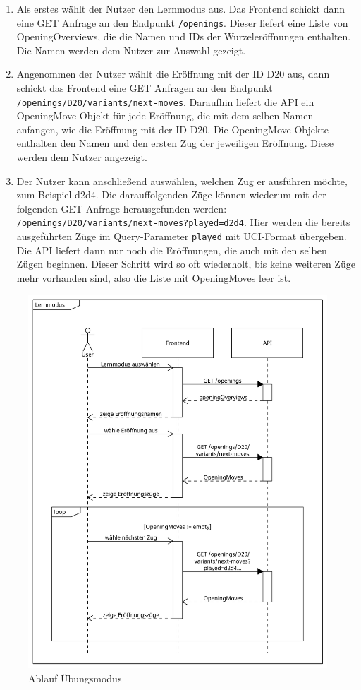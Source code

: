 \begin{enumerate}
     \item Als erstes wählt der Nutzer den Lernmodus aus. Das Frontend schickt dann eine GET Anfrage an den Endpunkt \lstinline{/openings}. Dieser liefert eine Liste von OpeningOverviews, die die Namen und IDs der Wurzeleröffnungen enthalten. Die Namen werden dem Nutzer zur Auswahl gezeigt.
     \item Angenommen der Nutzer wählt die Eröffnung mit der ID D20 aus, dann schickt das Frontend eine GET Anfragen an den Endpunkt \lstinline|/openings/D20/variants/next-moves|. Daraufhin liefert die API ein OpeningMove-Objekt für jede Eröffnung, die mit dem selben Namen anfangen, wie die Eröffnung mit der ID D20. Die OpeningMove-Objekte enthalten den Namen und den ersten Zug der jeweiligen Eröffnung. Diese werden dem Nutzer angezeigt.
     \item Der Nutzer kann anschließend auswählen, welchen Zug er ausführen möchte, zum Beispiel d2d4. Die darauffolgenden Züge können wiederum mit der folgenden GET Anfrage herausgefunden werden: \lstinline|/openings/D20/variants/next-moves?played=d2d4|. Hier werden die bereits ausgeführten Züge im Query-Parameter \lstinline{played} mit \ac{UCI}-Format übergeben. Die API liefert dann nur noch die Eröffnungen, die auch mit den selben Zügen beginnen. Dieser Schritt wird so oft wiederholt, bis keine weiteren Züge mehr vorhanden sind, also die Liste mit OpeningMoves leer ist.
\end{enumerate}

\begin{figure}[p]
    \includegraphics[width=\linewidth]{images/diagrams/sd_opening_training}
    \caption{Ablauf Übungsmodus}
    \label{fig:sd_opening_training}
\end{figure}

